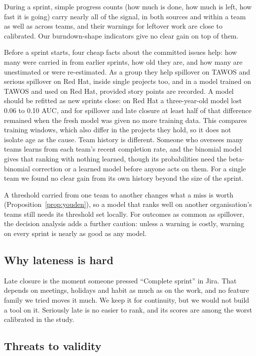 \documentclass[journal]{IEEEtran}
\begin{document}
During a sprint, simple progress counts (how much is done, how much is left, how fast it is going) carry nearly all of the signal, in both sources and within a team as well as across teams, and their warnings for leftover work are close to calibrated. Our burndown-shape indicators give no clear gain on top of them.

Before a sprint starts, four cheap facts about the committed issues help: how many were carried in from earlier sprints, how old they are, and how many are unestimated or were re-estimated. As a group they help spillover on TAWOS and serious spillover on Red Hat, inside single projects too, and in a model trained on TAWOS and used on Red Hat, provided story points are recorded. A model should be refitted as new sprints close: on Red Hat a three-year-old model lost 0.06 to 0.10 AUC, and for spillover and late closure at least half of that difference remained when the fresh model was given no more training data. This compares training windows, which also differ in the projects they hold, so it does not isolate age as the cause. Team history is different. Someone who oversees many teams learns from each team's recent completion rate, and the binomial model gives that ranking with nothing learned, though its probabilities need the beta-binomial correction or a learned model before anyone acts on them. For a single team we found no clear gain from its own history beyond the size of the sprint.

A threshold carried from one team to another changes what a miss is worth (Proposition~\ref{prop:youden}), so a model that ranks well on another organisation's teams still needs its threshold set locally. For outcomes as common as spillover, the decision analysis adds a further caution: unless a warning is costly, warning on every sprint is nearly as good as any model.

\subsection{Why lateness is hard}

Late closure is the moment someone pressed ``Complete sprint'' in Jira. That depends on meetings, holidays and habit as much as on the work, and no feature family we tried moves it much. We keep it for continuity, but we would not build a tool on it. Seriously late is no easier to rank, and its scores are among the worst calibrated in the study.

\subsection{Threats to validity}
\label{sec:threats}
\end{document}
